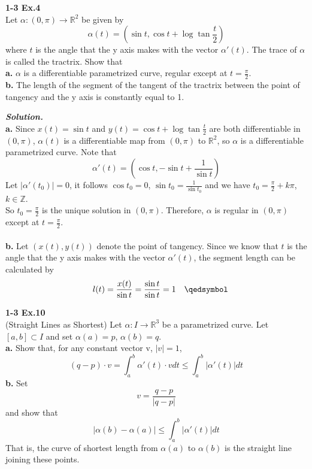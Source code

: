 \documentclass{article}
\begin{document}
\par
\textbf{1-3 Ex.4}\\
Let $\alpha: (0, \pi) \to \mathbb{R}^2$ be given by
$$
    \alpha(t) = (\sin t, \cos t + \log{\tan{\frac{t}{2}}})
$$
where $t$ is the angle that the y axis makes with the vector $\alpha'(t)$. The trace of $\alpha$ is 
called the tractrix. Show that\\
\textbf{a.} $\alpha$ is a differentiable parametrized curve, regular except at $t=\frac{\pi}{2}$.\\
\textbf{b.} The length of the segment of the tangent of the tractrix between the point of tangency and the y
axis is constantly equal to 1.

\par
\textbf{\textit{Solution.}}\\
\textbf{a. }Since $x(t) = \sin t$ and $y(t) = \cos t + \log{\tan{\frac{t}{2}}}$ are both differentiable in $(0, \pi)$,
$\alpha(t)$ is a differentiable map from $(0, \pi)$ to $\mathbb{R}^2$, so $\alpha$ is a differentiable
parametrized curve. Note that
$$
    \alpha'(t) = (\cos t, -\sin t + \frac{1}{\sin t})
$$
Let $|\alpha'(t_0)| = 0$, it follows $\cos t_0 = 0$, $\sin t_0 = \frac{1}{\sin t_0}$ and we have $t_0 = \frac{\pi}{2} + k\pi$, $k \in \mathbb{Z}$.\\
So $t_0 = \frac{\pi}{2}$ is the unique solution in $(0, \pi)$. Therefore, $\alpha$ is regular in $(0, \pi)$ except at $t = \frac{\pi}{2}$. \quad \qedsymbol\\\\
\textbf{b. } Let $(x(t), y(t))$ denote the point of tangency. Since we know that $t$ is the angle that the y axis makes with the vector
$\alpha'(t)$, the segment length can be calculated by
$$
    \quad l(t) = \frac{x(t)}{\sin t} = \frac{\sin t}{\sin t} = 1 \quad \qedsymbol
$$

\par
\textbf{1-3 Ex.10}\\
(Straight Lines as Shortest) Let $\alpha: I \to \mathbb{R}^3$ be a parametrized curve. Let $[a, b] \subset I$ and set $\alpha(a) = p$, $\alpha(b) = q$.\\
\textbf{a. }Show that, for any constant vector v, $|v| = 1$,
$$
    (q - p) \cdot v = \int_a^b \alpha'(t) \cdot v dt \leq \int_a^b |\alpha'(t)|dt
$$
\textbf{b. }Set
$$
    v = \frac{q - p}{|q - p|}
$$
and show that
$$
    |\alpha(b) - \alpha(a)| \leq \int_a^b |\alpha'(t)|dt
$$
That is, the curve of shortest length from $\alpha(a)$ to $\alpha(b)$ is the straight line joining these points.
\end{document}
